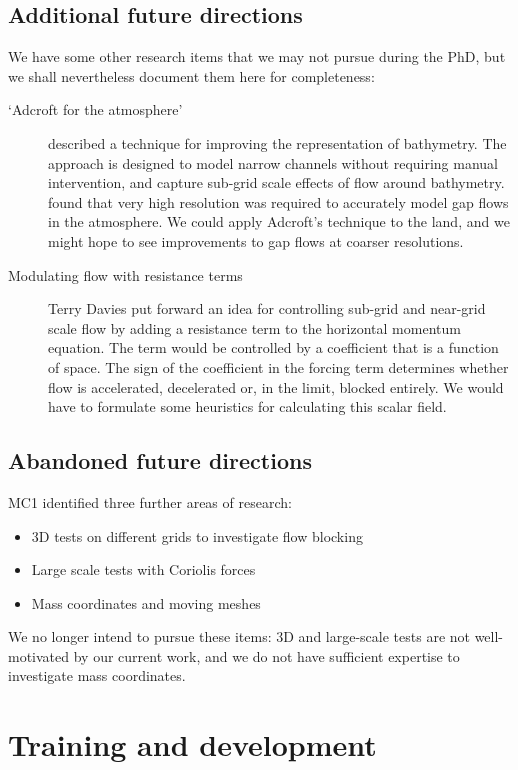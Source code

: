 \documentclass[a4paper]{article}
\begin{document}
\subsection*{Additional future directions}
We have some other research items that we may not pursue during the PhD, but we shall nevertheless document them here for completeness:
\begin{description}
	\item[`Adcroft for the atmosphere']{\citet{adcroft2013} described a technique for improving the representation of bathymetry.  The approach is designed to model narrow channels without requiring manual intervention, and capture sub-grid scale effects of flow around bathymetry.  \citet{gohm2004} found that very high resolution was required to accurately model gap flows in the atmosphere.  We could apply Adcroft's technique to the land, and we might hope to see improvements to gap flows at coarser resolutions.}
	\item[Modulating flow with resistance terms]{Terry Davies put forward an idea for controlling sub-grid and near-grid scale flow by adding a resistance term to the horizontal momentum equation.  The term would be controlled by a coefficient that is a function of space.  The sign of the coefficient in the forcing term determines whether flow is accelerated, decelerated or, in the limit, blocked entirely.  We would have to formulate some heuristics for calculating this scalar field.}
\end{description}

\subsection*{Abandoned future directions}
MC1 identified three further areas of research:
\begin{itemize}
	\item 3D tests on different grids to investigate flow blocking
	\item Large scale tests with Coriolis forces
	\item Mass coordinates and moving meshes
\end{itemize}
We no longer intend to pursue these items: 3D and large-scale tests are not well-motivated by our current work, and we do not have sufficient expertise to investigate mass coordinates.

\section{Training and development}
\end{document}
